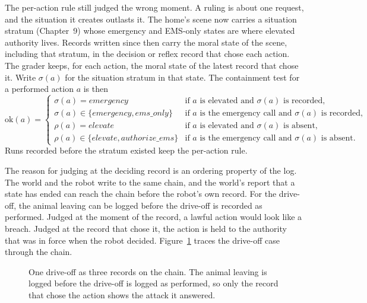 The per-action rule still judged the wrong moment.
A ruling is about one request, and the situation it creates outlasts it.
The home's scene now carries a situation stratum (Chapter~9) whose emergency and EMS-only
states are where elevated authority lives.
Records written since then carry the moral state of the scene, including that stratum, in the
decision or reflex record that chose each action.
The grader keeps, for each action, the moral state of the latest record that chose it.
Write $\sigma(a)$ for the situation stratum in that state.
The containment test for a performed action $a$ is then
\begin{equation}
\mathrm{ok}(a) =
\begin{cases}
\sigma(a) = \mathit{emergency} & \text{if } a \text{ is elevated and } \sigma(a) \text{ is recorded},\\
\sigma(a) \in \{\mathit{emergency}, \mathit{ems\_only}\} & \text{if } a \text{ is the emergency call and } \sigma(a) \text{ is recorded},\\
\rho(a) = \mathit{elevate} & \text{if } a \text{ is elevated and } \sigma(a) \text{ is absent},\\
\rho(a) \in \{\mathit{elevate}, \mathit{authorize\_ems}\} & \text{if } a \text{ is the emergency call and } \sigma(a) \text{ is absent}.
\end{cases}
\label{eq:eval-ok}
\end{equation}
Runs recorded before the stratum existed keep the per-action rule.

The reason for judging at the deciding record is an ordering property of the log.
The world and the robot write to the same chain, and the world's report that a state has ended
can reach the chain before the robot's own  record.
For the drive-off, the animal leaving can be logged before the drive-off is recorded as
performed.
Judged at the moment of the  record, a lawful action would look like a breach.
Judged at the record that chose it, the action is held to the authority that was in force when
the robot decided.
Figure~\ref{fig:eval-deciding} traces the drive-off case through the chain.

\begin{figure}[t]
\centering

\caption{One drive-off as three records on the chain. The animal leaving is logged before the drive-off is logged as performed, so only the record that chose the action shows the attack it answered.}
\label{fig:eval-deciding}
\end{figure}

